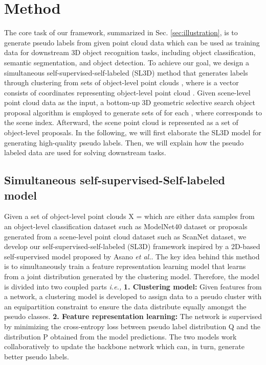 \documentclass{article}
\begin{document}
\section{Method}
\label{sec:method}
The core task of our framework, summarized in Sec. \ref{sec:illustration}, is to generate pseudo labels from given point cloud data which can be used as training data for downstream 3D object recognition tasks, including object classification, semantic segmentation, and object detection. To achieve our goal, we design a simultaneous self-supervised-self-labeled (SL3D) method that generates labels through clustering from sets of object-level point clouds , {where  is a vector consists of  coordinates representing object-level point cloud .} Given scene-level point cloud data  as the input, a bottom-up 3D geometric selective search object proposal algorithm \cite{ren2021wypr} is employed to generate sets of  for each , where  corresponds to the scene index. Afterward, the scene point cloud is represented as a set of object-level proposals. In the following, we will first elaborate the SL3D model for generating high-quality pseudo labels. Then, we will explain how the pseudo labeled data are used for solving downstream tasks.

\subsection{Simultaneous self-supervised-Self-labeled model}

Given a set of object-level  point clouds X =  which are either data samples from an object-level classification dataset such as ModelNet40 \cite{wu20153d} dataset or proposals generated from a scene-level point cloud dataset such as ScanNet \cite{dai2017scannet} dataset, we develop our self-supervised-self-labeled (SL3D) framework inspired by a 2D-based self-supervised model proposed by Asano \textit{et al.}\cite{asano2020self}. The key idea behind this method is to simultaneously train a feature representation learning model that learns from a joint distribution generated by the clustering model. 
Therefore, the model is divided into two coupled parts \textit{i.e.,} \textbf{1. Clustering model:} Given features from a network, a  clustering model is developed to assign data to a pseudo cluster with an equipartition constraint to ensure the data distribute equally amongst the pseudo classes. \textbf{2. Feature representation learning:} The network is supervised by minimizing the cross-entropy loss between pseudo label distribution Q and the distribution P obtained from the model predictions. The two models work collaboratively to update the backbone network  which can, in turn, generate better pseudo labels.
\end{document}
